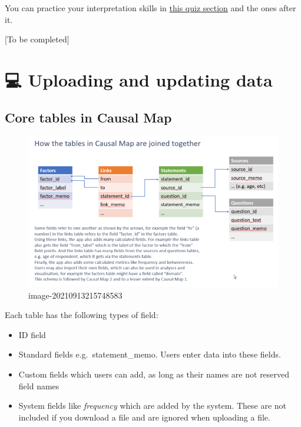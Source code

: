 \documentclass[
]{book}
\providecommand{\tightlist}{%
  \setlength{\itemsep}{0pt}\setlength{\parskip}{0pt}}
\begin{document}
You can practice your interpretation skills in \href{https://causalmap.shinyapps.io/quizzes/\#section-causal-mapping-interpretation}{this quiz section} and the ones after it.

{[}To be completed{]}

\hypertarget{part-uploading-and-updating-data}{%
\part{💻 Uploading and updating data}\label{part-uploading-and-updating-data}}

\hypertarget{core-tables}{%
\chapter{Core tables in Causal Map}\label{core-tables}}

\begin{figure}
\centering
\includegraphics{_assets/image-20210913215748583.png}
\caption{image-20210913215748583}
\end{figure}

Each table has the following types of field:

\begin{itemize}
\tightlist
\item
  ID field
\item
  Standard fields e.g.~statement\_memo. Users enter data into these fields.
\item
  Custom fields which users can add, as long as their names are not reserved field names
\item
  System fields like \emph{frequency} which are added by the system. These are not included if you download a file and are ignored when uploading a file.
\end{itemize}
\end{document}
